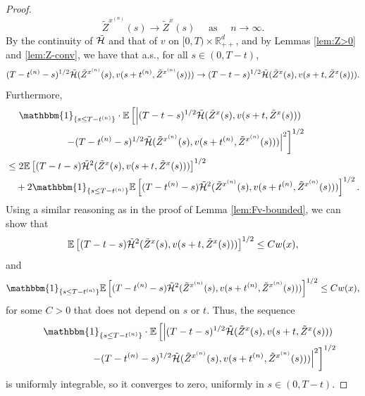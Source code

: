 \documentclass[11pt]{article}
\theoremstyle{definition}
\theoremstyle{plain}
\newcommand{\R}{\mathbb{R}}
\newcommand{\cH}{{\cal H}}
\newcommand{\mbOne}{\mathbbm{1}}
\begin{document}
\begin{appendices}
\begin{proof}
\[
\tilde{Z}^{x^{(n)}}(s) \to \tilde{Z}^x(s) \quad \text{ as } \quad n \to \infty.
\]
By the continuity of \( \tilde \cH \) and that of \( v \) on $[0, T)\times \R_{++}^d$, and by Lemmas \ref{lem:Z>0} and \ref{lem:Z-conv},  
we have that a.s., for all $s \in (0,T - t)$,
\[
(T - t^{(n)} - s)^{1/2} \tilde \cH(\tilde{Z}^{x^{(n)}}(s), v(s + t^{(n)}, \tilde{Z}^{x^{(n)}}(s))) \to
(T - t - s)^{1/2} \tilde \cH(\tilde{Z}^x(s), v(s + t, \tilde{Z}^x(s))).
\]
Furthermore, 
\begin{align*}
&\quad \ \mbOne_{\{s \leq T - t^{(n)}\}} \cdot \mathbb{E} \left[ \left| (T - t - s)^{1/2} 
\tilde \cH(\tilde{Z}^x(s), v(s + t, \tilde{Z}^x(s))) \right. \right. \\
&\left. \left. \qquad \qquad \qquad - (T - t^{(n)} - s)^{1/2} \tilde \cH(\tilde{Z}^{x^{(n)}}(s), v(s + t^{(n)}, \tilde{Z}^{x^{(n)}}(s))) \right|^2 \right]^{1/2} \\
&\leq 2 \mathbb{E} \left[ (T - t  - s) 
\tilde \cH^2(\tilde{Z}^x(s), v(s + t, \tilde{Z}^x(s))) \right]^{1/2} \\
&\quad + 2\mbOne_{\{s \leq T - t^{(n)}\}} \mathbb{E} \left[ (T - t^{(n)} - s) 
\tilde \cH^2(\tilde{Z}^{x^{(n)}}(s), v(s + t^{(n)}, \tilde{Z}^{x^{(n)}}(s)))\right]^{1/2}. 
\end{align*}
Using a similar reasoning as in the proof of Lemma \ref{lem:Fv-bounded}, we can show that 
\[
\mathbb{E} \left[ (T - t  - s) \tilde \cH^2(\tilde{Z}^x(s), v(s + t, \tilde{Z}^x(s))) \right]^{1/2} \leq C w(x), 
\]
and 
\[
\mbOne_{\{s \leq T - t^{(n)}\}} \mathbb{E} \left[ (T - t^{(n)} - s) 
\tilde \cH^2(\tilde{Z}^{x^{(n)}}(s), v(s + t^{(n)}, \tilde{Z}^{x^{(n)}}(s)))\right]^{1/2} \leq C w(x), 
\]
for some $C>0$ that does not depend on $s$ or $t$. Thus, the sequence
\begin{align*}
&\quad \ \mbOne_{\{s \leq T - t^{(n)}\}} \cdot \mathbb{E} \left[ \left| (T - t - s)^{1/2} 
\tilde \cH(\tilde{Z}^x(s), v(s + t, \tilde{Z}^x(s))) \right. \right. \\
&\left. \left. \qquad \qquad \qquad - (T - t^{(n)} - s)^{1/2} \tilde \cH(\tilde{Z}^{x^{(n)}}(s), v(s + t^{(n)}, \tilde{Z}^{x^{(n)}}(s))) \right|^2 \right]^{1/2}
\end{align*}
is uniformly integrable, so it converges to zero,  
uniformly in \( s \in (0, T - t) \).


\end{proof}
\end{appendices}
\end{document}
